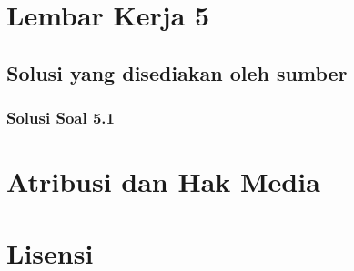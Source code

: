 \documentclass[11pt,a4paper,oneside]{book}
\begin{document}
\chapter{Lembar Kerja 5}


\section*{Solusi yang disediakan oleh sumber}
\subsection*{Solusi Soal 5.1}


\backmatter
\listoffigures
\chapter*{Atribusi dan Hak Media}





\chapter*{Lisensi}
\Lizenztext
\end{document}
